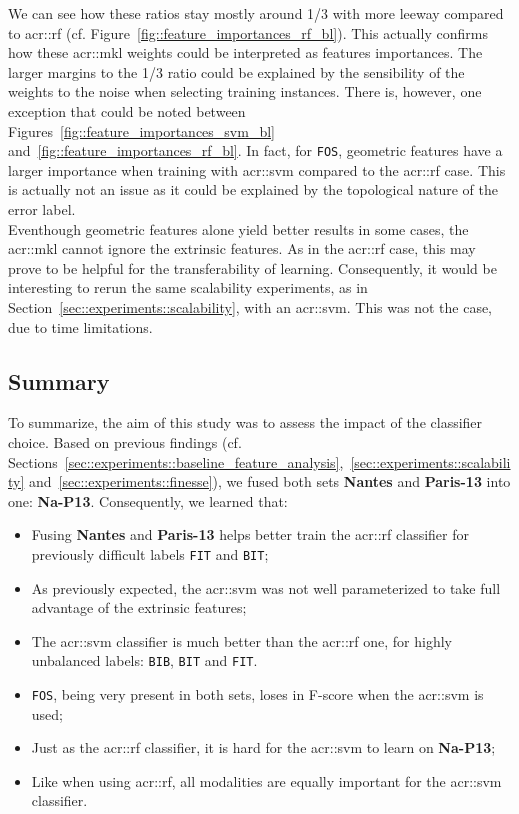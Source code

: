         We can see how these ratios stay mostly around \num[fraction-function = \sfrac]{1/3} with more leeway compared to \gls{acr::rf} (cf. Figure~\ref{fig::feature_importances_rf_bl}).
        This actually confirms how these \gls{acr::mkl} weights could be interpreted as features importances.
        The larger margins to the \num[fraction-function = \sfrac]{1/3} ratio could be explained by the sensibility of the weights to the noise when selecting training instances.
        There is, however, one exception that could be noted between Figures~\ref{fig::feature_importances_svm_bl} and~\ref{fig::feature_importances_rf_bl}.
        In fact, for \texttt{FOS}, geometric features have a larger importance when training with \gls{acr::svm} compared to the \gls{acr::rf} case.
        This is actually not an issue as it could be explained by the topological nature of the error label.\\

        Eventhough geometric features alone yield better results in some cases, the \gls{acr::mkl} cannot ignore the extrinsic features.
        As in the \gls{acr::rf} case, this may prove to be helpful for the transferability of learning.
        Consequently, it would be interesting to rerun the same scalability experiments, as in Section~\ref{sec::experiments::scalability}, with an \gls{acr::svm}.
        This was not the case, due to time limitations.

    \subsection{Summary}
        \label{subsec::advanced_experiments::classifier::summary}
        To summarize, the aim of this study was to assess the impact of the classifier choice.
        Based on previous findings (cf. Sections~\ref{sec::experiments::baseline_feature_analysis},~\ref{sec::experiments::scalability} and~\ref{sec::experiments::finesse}), we fused both sets \textbf{Nantes} and \textbf{Paris-13} into one: \textbf{Na-P13}.
        Consequently, we learned that:
        \begin{itemize}[label=\(\blacktriangleright\)]
            \item Fusing \textbf{Nantes} and \textbf{Paris-13} helps better train the \gls{acr::rf} classifier for previously difficult labels \texttt{FIT} and \texttt{BIT};
            \item As previously expected, the \gls{acr::svm} was not well parameterized to take full advantage of the extrinsic features;
            \item The \gls{acr::svm} classifier is much better than the \gls{acr::rf} one, for highly unbalanced labels: \texttt{BIB}, \texttt{BIT} and \texttt{FIT}.
            \item \texttt{FOS}, being very present in both sets, loses in F-score when the \gls{acr::svm} is used;
            \item Just as the \gls{acr::rf} classifier, it is hard for the \gls{acr::svm} to learn on \textbf{Na-P13};
            \item Like when using \gls{acr::rf}, all modalities are equally important for the \gls{acr::svm} classifier.
        \end{itemize}


